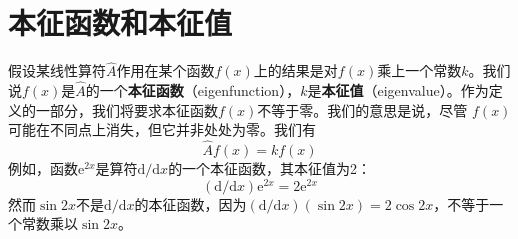 \section{本征函数和本征值}
	假设某线性算符$\hat{A}$作用在某个函数$f\left(x\right)$上的结果是对$f\left(x\right)$乘上一个常数$k$。我们说$f\left(x\right)$是$\hat{A}$的一个\textbf{本征函数}（eigenfunction），$k$是\textbf{本征值}（eigenvalue）。作为定义的一部分，我们将要求本征函数$f\left(x\right)$不等于零。我们的意思是说，尽管 $f\left(x\right)$ 可能在不同点上消失，但它并非处处为零。我们有
	\begin{equation}
		\boxed{
			\hat{A}f\left(x\right) = kf\left(x\right)
		}
		\label{eq:3.14 definition of eigenfunctions and eigenvalues}
	\end{equation}
	例如，函数$\mathrm{e}^{2x}$是算符$\mathrm{d}/\mathrm{d}x$的一个本征函数，其本征值为2：
	\begin{equation*}
		\left(\mathrm{d}/\mathrm{d}x\right)\mathrm{e}^{2x} = 2 \mathrm{e}^{2x}
	\end{equation*}
	然而$\sin 2x$不是$\mathrm{d}/\mathrm{d}x$的本征函数，因为$\left(\mathrm{d}/\mathrm{d}x\right)\left(\sin 2x\right) = 2 \cos 2x$，不等于一个常数乘以$\sin 2x$。

